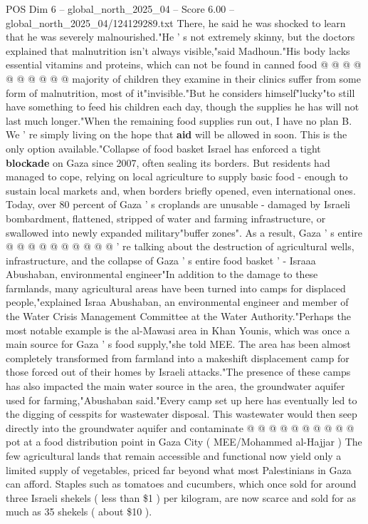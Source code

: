 \begin{textsample}{POS Dim 6 – global\_north\_2025\_04 – Score 6.00 – global\_north\_2025\_04/124129289.txt}
There, he said he was shocked to learn that he was severely malnourished."He ' s not extremely skinny, but the doctors explained that malnutrition isn't always visible,"said Madhoun."His body lacks essential vitamins and proteins, which can not be found in canned food @ @ @ @ @ @ @ @ @ @ majority of children they examine in their clinics suffer from some form of malnutrition, most of it"invisible."But he considers himself"lucky"to still have something to feed his children each day, though the supplies he has will not last much longer."When the remaining food supplies run out, I have no plan B.
We ' re simply living on the hope that \textbf{aid} will be allowed in soon.
This is the only option available."Collapse of food basket Israel has enforced a tight \textbf{blockade} on Gaza since 2007, often sealing its borders.
But residents had managed to cope, relying on local agriculture to supply basic food - enough to sustain local markets and, when borders briefly opened, even international ones.
Today, over 80 percent of Gaza ' s croplands are unusable - damaged by Israeli bombardment, flattened, stripped of water and farming infrastructure, or swallowed into newly expanded military"buffer zones".
As a result, Gaza ' s entire @ @ @ @ @ @ @ @ @ @ ' re talking about the destruction of agricultural wells, infrastructure, and the collapse of Gaza ' s entire food basket ' - Israaa Abushaban, environmental engineer"In addition to the damage to these farmlands, many agricultural areas have been turned into camps for displaced people,"explained Israa Abushaban, an environmental engineer and member of the Water Crisis Management Committee at the Water Authority."Perhaps the most notable example is the al-Mawasi area in Khan Younis, which was once a main source for Gaza ' s food supply,"she told MEE.
The area has been almost completely transformed from farmland into a makeshift displacement camp for those forced out of their homes by Israeli attacks."The presence of these camps has also impacted the main water source in the area, the groundwater aquifer used for farming,"Abushaban said."Every camp set up here has eventually led to the digging of cesspits for wastewater disposal.
This wastewater would then seep directly into the groundwater aquifer and contaminate @ @ @ @ @ @ @ @ @ @ pot at a food distribution point in Gaza City ( MEE/Mohammed al-Hajjar ) The few agricultural lands that remain accessible and functional now yield only a limited supply of vegetables, priced far beyond what most Palestinians in Gaza can afford.
Staples such as tomatoes and cucumbers, which once sold for around three Israeli shekels ( less than \$1 ) per kilogram, are now scarce and sold for as much as 35 shekels ( about \$10 ).

\end{textsample}
